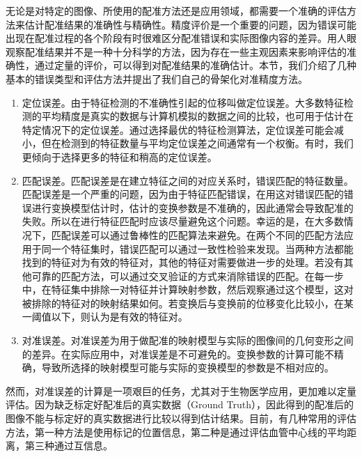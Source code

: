 无论是对特定的图像、所使用的配准方法还是应用领域，都需要一个准确的评估方法来估计配准结果的准确性与精确性。精度评价是一个重要的问题，因为错误可能出现在配准过程的各个阶段有时很难区分配准错误和实际图像内容的差异。用人眼观察配准结果并不是一种十分科学的方法，因为存在一些主观因素来影响评估的准确性，通过定量的评价，可以得到对配准结果的准确估计。本节，我们介绍了几种基本的错误类型和评估方法\cite{barbara}并提出了我们自己的骨架化对准精度方法。


\begin{enumerate}
\item 定位误差。由于特征检测的不准确性引起的位移叫做定位误差。大多数特征检测的平均精度是真实的数据与计算机模拟的数据之间的比较，也可用于估计在特定情况下的定位误差。通过选择最优的特征检测算法，定位误差可能会减小，但在检测到的特征数量与平均定位误差之间通常有一个权衡。有时，我们更倾向于选择更多的特征和稍高的定位误差。

\item 匹配误差。匹配误差是在建立特征之间的对应关系时，错误匹配的特征数量。匹配误差是一个严重的问题，因为由于特征匹配错误，在用这对错误匹配的错误进行变换模型估计时，估计的变换参数是不准确的，因此通常会导致配准的失败。所以在进行特征匹配时应该尽量避免这个问题。幸运的是，在大多数情况下，匹配误差可以通过鲁棒性的匹配算法来避免。在两个不同的匹配方法应用于同一个特征集时，错误匹配可以通过一致性检验来发现。当两种方法都能找到的特征对为有效的特征对，其他的特征对需要做进一步的处理。若没有其他可靠的匹配方法，可以通过交叉验证的方式来消除错误的匹配。在每一步中，在特征集中排除一对特征并计算映射参数，然后观察通过这个模型，这对被排除的特征对的映射结果如何。若变换后与变换前的位移变化比较小，在某一阈值以下，则认为是有效的特征对。

\item 对准误差。对准误差为用于做配准的映射模型与实际的图像间的几何变形之间的差异。在实际应用中，对准误差是不可避免的。变换参数的计算可能不精确，导致所选择的映射模型可能与实际的变换模型的参数是不相对应的。

\end{enumerate}


然而，对准误差的计算是一项艰巨的任务，尤其对于生物医学应用，更加难以定量评估。因为缺乏标定好配准后的真实数据（Ground Truth），因此得到的配准后的图像不能与标定好的真实数据进行比较以得到估计结果。目前，有几种常用的评估方法，第一种方法是使用标记的位置信息，第二种是通过评估血管中心线的平均距离，第三种通过互信息\cite{kolar}。

